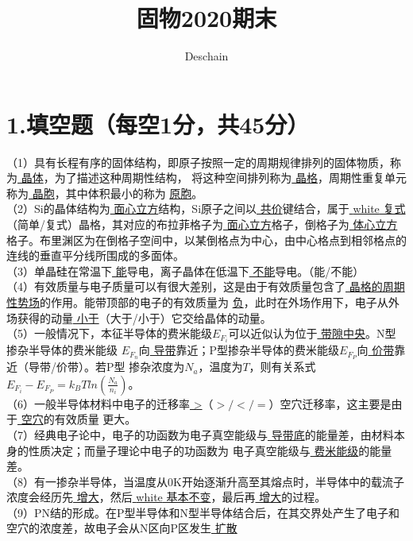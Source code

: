\documentclass[UTF8]{ctexart}
\title{固物2020期末}
\author{Deschain}
\begin{document}
\maketitle
\section*{1.填空题（每空1分，共45分）}
（1）具有长程有序的固体结构，即原子按照一定的周期规律排列的固体物质，称为\uline{{\color{white} 晶体}}，为了描述这种周期性结构，
将这种空间排列称为\uline{{\color{white} 晶格}}，周期性重复单元称为\uline{{\color{white} 晶胞}}，其中体积最小的称为
\uline{{\color{white} 原胞}}。\\
（2）Si的晶体结构为\uline{{\color{white} 面心立方}}结构，Si原子之间以\uline{{\color{white} 共价}}键结合，属于\uline{{\color
{white} 复式}}（简单/复式）晶格，其对应的布拉菲格子为\uline{{\color{white} 面心立方}}格子，倒格子为\uline{{\color{white} 体心立方}}
格子。布里渊区为在倒格子空间中，以某倒格点为中心，由中心格点到相邻格点的连线的垂直平分线所围成的多面体。\\
（3）单晶硅在常温下\uline{{\color{white} 能}}导电，离子晶体在低温下\uline{{\color{white} 不能}}导电。（能/不能）\\
（4）有效质量与电子质量可以有很大差别，这是由于有效质量包含了\uline{{\color{white} 晶格的周期性势场}}的作用。能带顶部的电子的有效质量为
\uline{{\color{white} 负}}，此时在外场作用下，电子从外场获得的动量\uline{{\color{white} 小于}}（大于/小于）它交给晶体的动量。\\
（5）一般情况下，本征半导体的费米能级$E_{F_i}$可以近似认为位于\uline{{\color{white} 带隙中央}}。N型掺杂半导体的费米能级
$E_{F_n}$向\uline{{\color{white} 导带}}靠近；P型掺杂半导体的费米能级$E_{F_P}$向\uline{{\color{white} 价带}}靠近（导带/价带）。若P型
掺杂浓度为$N_a$，温度为$T$，则有关系式$E_{F_i}-E_{F_P}=k_BTln(\frac{N_a}{n_i})$。\\
（6）一般半导体材料中电子的迁移率\uline{{\color{white} >}}（$>/</=$）空穴迁移率，这主要是由于\uline{{\color{white} 空穴}}的有效质量
更大。\\
（7）经典电子论中，电子的功函数为电子真空能级与\uline{{\color{white} 导带底}}的能量差，由材料本身的性质决定；而量子理论中电子的功函数为
电子真空能级与\uline{{\color{white} 费米能级}}的能量差。\\
（8）有一掺杂半导体，当温度从0K开始逐渐升高至其熔点时，半导体中的载流子浓度会经历先\uline{{\color{white} 增大}}，然后\uline{{\color
{white} 基本不变}}，最后再\uline{{\color{white} 增大}}的过程。\\
（9）PN结的形成。在P型半导体和N型半导体结合后，在其交界处产生了电子和空穴的浓度差，故电子会从N区向P区发生\uline{{\color{white} 扩散}}
\end{document}

